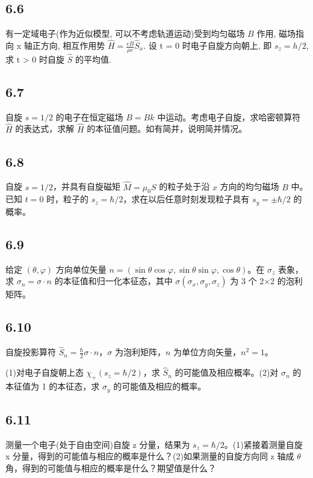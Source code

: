 \subsection{6.6}
有一定域电子(作为近似模型, 可以不考虑轨道运动)受到均匀磁场 $B$ 作用, 磁场指向 x 轴正方向, 相互作用势 $\hat{H} = \frac{eB}{\mu c}\hat{S}_x$. 设 t = 0 时电子自旋方向朝上, 即 $s_z = h/2$, 求 t > 0 时自旋 $\hat{S}$ 的平均值.

\subsection{6.7}
自旋 $s = 1/2$ 的电子在恒定磁场 $B = Bk$ 中运动。考虑电子自旋，求哈密顿算符 $\hat{H}$ 的表达式，求解 $\hat{H}$ 的本征值问题。如有简并，说明简并情况。

\subsection{6.8}
自旋 $s = 1/2$，并具有自旋磁矩 $\hat{M} = \mu_0 S$ 的粒子处于沿 $x$ 方向的均匀磁场 $B$ 中。已知 $t = 0$ 时，粒子的 $s_z = \hbar / 2$，求在以后任意时刻发现粒子具有 $s_y = \pm \hbar / 2$ 的概率。

\subsection{6.9}
给定 $(\theta, \varphi)$ 方向单位矢量 $n = (\sin \theta \cos \varphi, \sin \theta \sin \varphi, \cos \theta)$。在 $\sigma_z$ 表象，求 $\sigma_n = \sigma \cdot n$ 的本征值和归一化本征态，其中 $\sigma(\sigma_x, \sigma_y, \sigma_z)$ 为 3 个 2×2 的泡利矩阵。

\subsection{6.10}
自旋投影算符 $\hat{S}_n = \frac{\hbar}{2} \sigma \cdot n$，$\sigma$ 为泡利矩阵，$n$ 为单位方向矢量，$n^2 = 1$。

(1)对电子自旋朝上态 $\chi_+ (s_z = \hbar / 2)$，求 $\hat{S}_n$ 的可能值及相应概率。(2)对 $\sigma_n$ 的本征值为 1 的本征态，求 $\sigma_y$ 的可能值及相应的概率。

\subsection{6.11}
测量一个电子(处于自由空间)自旋 z 分量，结果为 $s_z = \hbar / 2$。(1)紧接着测量自旋 x 分量，得到的可能值与相应的概率是什么？(2)如果测量的自旋方向同 z 轴成 $\theta$ 角，得到的可能值与相应的概率是什么？期望值是什么？

